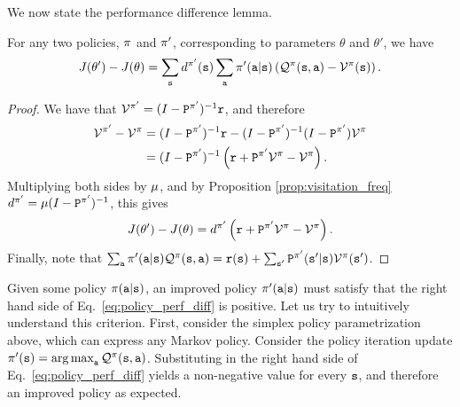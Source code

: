 We now state the performance difference lemma.
\begin{lemma}\label{lemma:perf_diff}
    For any two policies, $\pi$ and $\pi'$, corresponding to parameters $\theta$ and $\theta'$, we have
    \begin{equation}\label{eq:policy_perf_diff}
        J(\theta') - J(\theta)= \sum_{{\tt s}} d^{\pi'}({\tt s}) \sum_{\tt a} \pi'({\tt a}|{\tt s})\left( \mathcal{Q}^{\pi}({\tt s},{\tt a}) - \mathcal{V}^{\pi}({\tt s})\right).
    \end{equation}
\end{lemma}
\begin{proof}
    We have that $\mathcal{V}^{\pi'} = (I - {\tt P}^{\pi'})^{-1}{\tt r}$, and therefore
    \begin{equation*}
    \begin{split}
        \mathcal{V}^{\pi'} - \mathcal{V}^\pi &= (I - {\tt P}^{\pi'})^{-1}{\tt r} - (I - {\tt P}^{\pi'})^{-1} (I - {\tt P}^{\pi'}) \mathcal{V}^\pi \\
        &=(I - {\tt P}^{\pi'})^{-1} \left({\tt r} +{\tt P}^{\pi'}\mathcal{V}^\pi - \mathcal{V}^\pi \right).
    \end{split}
    \end{equation*}
    Multiplying both sides by $\mu$, and by Proposition \ref{prop:visitation_freq} $d^{\pi'}=\mu (I - {\tt P}^{\pi'})^{-1}$, this gives
    \begin{equation*}
        J(\theta') - J(\theta) = d^{\pi'}\left({\tt r} +{\tt P}^{\pi'}\mathcal{V}^\pi - \mathcal{V}^\pi \right).
    \end{equation*}
    Finally, note that $\sum_{\tt a} \pi'({\tt a}|{\tt s}) \mathcal{Q}^{\pi}({\tt s},{\tt a}) = {\tt r}({\tt s}) + \sum_{{\tt s}'}{\tt P}^{\pi'}({\tt s}'|{\tt s})\mathcal{V}^{\pi}({\tt s}')$.
\end{proof}

Given some policy $\pi({\tt a}|{\tt s})$, an improved policy $\pi'({\tt a}|{\tt s})$ must satisfy that the right hand side of Eq.~\ref{eq:policy_perf_diff} is positive.
Let us try to intuitively understand this criterion. First, consider the simplex policy parametrization above, which can express any Markov policy.  Consider the policy iteration update $\policy'(\state) = \argmax_{\action} \QValue^{\policy}(\state,\action)$. Substituting in the right hand side of Eq.~\ref{eq:policy_perf_diff} yields a non-negative value for every ${\tt s}$, and therefore an improved policy as expected.

